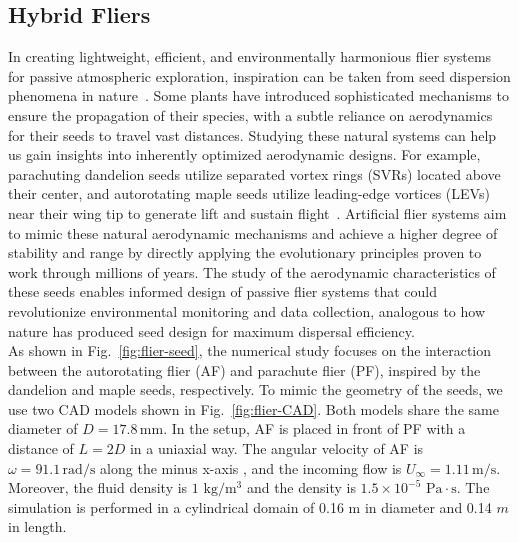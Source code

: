 \documentclass[preprint,12pt,sort&compress]{elsarticle}
\theoremstyle{definition}%
\begin{document}
\subsection{Hybrid Fliers}
In creating lightweight, efficient, and environmentally harmonious flier systems for passive atmospheric exploration,
inspiration can be taken from seed dispersion phenomena in nature~\cite{kim2023flier,iyer2022wind}. Some plants have introduced sophisticated mechanisms to ensure 
the propagation of their species, with a subtle reliance on aerodynamics for their seeds to travel vast distances. Studying 
these natural systems can help us gain insights into inherently optimized aerodynamic designs. For example, parachuting dandelion 
seeds utilize separated vortex rings (SVRs) located above their center, and autorotating maple seeds utilize leading-edge vortices 
(LEVs) near their wing tip to generate lift and sustain flight~\cite{cummins2018separated, lentink2009leading}. Artificial flier systems aim to 
mimic these natural aerodynamic mechanisms and achieve a higher degree of stability and range by directly applying the evolutionary 
principles proven to work through millions of years. The study of the aerodynamic characteristics of these seeds enables informed 
design of passive flier systems that could revolutionize environmental monitoring and data collection, analogous to how nature has 
produced seed design for maximum dispersal efficiency.\\
As shown in Fig.~\ref{fig:flier-seed}, the numerical study focuses on the interaction between the autorotating flier (AF) and 
parachute flier (PF), inspired by the dandelion and maple seeds, respectively. To mimic the geometry of the seeds, we use two CAD
models shown in Fig.~\ref{fig:flier-CAD}. Both models share the same diameter of $D=17.8\,\mathrm{mm}$.
In the setup, AF is placed in front of PF with a distance of $L=2D$ in a uniaxial way. The angular velocity of AF is 
$\omega=91.1\,\mathrm{rad/s}$ along the minus x-axis , and the incoming flow is $U_\infty=1.11\,\mathrm{m/s}$.
Moreover, the fluid density is $1$ $\mathrm{kg/m^3}$ and the density is $1.5\times 10^{-5}$ $\mathrm{Pa\cdot s}$.
The simulation is performed in a cylindrical domain of 0.16 $\mathrm{m}$ in diameter and 0.14 $m$ in length.
\end{document}
